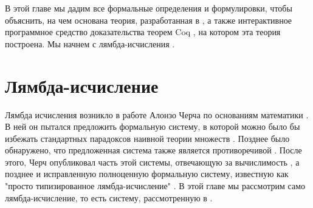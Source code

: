 В этой главе мы дадим все формальные определения и формулировки, чтобы объяснить, на чем основана теория, разработанная в \cite{base_article},
а также интерактивное программное средство доказательства теорем Coq \cite{the_coq_development_team_2021_4501022}, на котором эта теория построена.
Мы начнем с лямбда-исчисления \cite{rojas2015tutorial}.
\section{Лямбда-исчисление}
Лямбда исчисления возникло в работе Алонзо Черча по основаниям математики \cite{Church01}. В ней он пытался предложить формальную систему,
в которой можно было бы избежать стандартных парадоксов наивной теории множеств \cite{Miller_ahistorical}. Позднее было обнаружено, что
предложенная система также является противоречивой  \cite{Kleene01}. После этого, Черч опубликовал часть этой системы, отвечающую за вычислимость
\cite{Church02}, а позднее и исправленную полноценную формальную систему, известную как "просто типизированное лямбда-исчисление" \cite{Church03}.
В этой главе мы рассмотрим само лямбда-исчисление, то есть систему, рассмотренную в \cite{Church02}.

